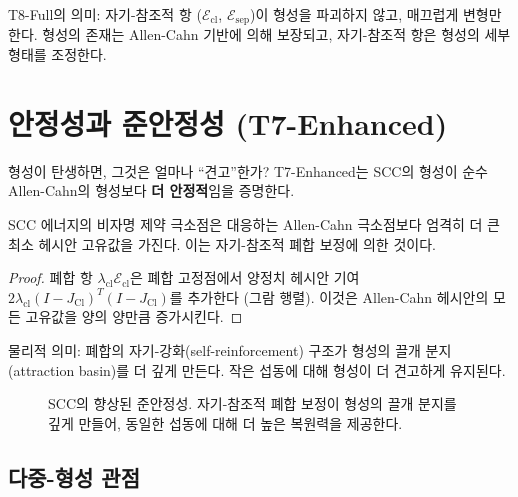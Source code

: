 T8-Full의 의미: 자기-참조적 항 ($\mathcal{E}_{\mathrm{cl}}$, $\mathcal{E}_{\mathrm{sep}}$)이 형성을 파괴하지 않고, 매끄럽게 변형만 한다. 형성의 존재는 Allen-Cahn 기반에 의해 보장되고, 자기-참조적 항은 형성의 세부 형태를 조정한다.


\section{안정성과 준안정성 (T7-Enhanced)}
\label{sec:metastability}

형성이 탄생하면, 그것은 얼마나 ``견고''한가? T7-Enhanced는 SCC의 형성이 순수 Allen-Cahn의 형성보다 \textbf{더 안정적}임을 증명한다.

\begin{theorem}
\label{thm:T7-Enhanced}
SCC 에너지의 비자명 제약 극소점은 대응하는 Allen-Cahn 극소점보다 엄격히 더 큰 최소 헤시안 고유값을 가진다. 이는 자기-참조적 폐합 보정에 의한 것이다.
\end{theorem}

\begin{proof}
폐합 항 $\lambda_{\mathrm{cl}} \mathcal{E}_{\mathrm{cl}}$은 폐합 고정점에서 양정치 헤시안 기여 $2\lambda_{\mathrm{cl}}(I - J_{\mathrm{Cl}})^T(I - J_{\mathrm{Cl}})$를 추가한다 (그람 행렬). 이것은 Allen-Cahn 헤시안의 모든 고유값을 양의 양만큼 증가시킨다.
\end{proof}

물리적 의미: 폐합의 자기-강화(self-reinforcement) 구조가 형성의 끌개 분지(attraction basin)를 더 깊게 만든다. 작은 섭동에 대해 형성이 더 견고하게 유지된다.

\begin{figure}[t]
\centering
\caption{SCC의 향상된 준안정성. 자기-참조적 폐합 보정이 형성의 끌개 분지를 깊게 만들어, 동일한 섭동에 대해 더 높은 복원력을 제공한다.}
\label{fig:scc-vs-allencahn}
\end{figure}

\subsection{다중-형성 관점}

